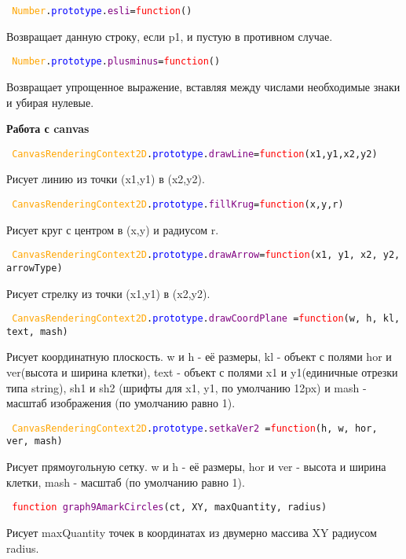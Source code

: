 \texttt{
	\textcolor{Orange}{Number}.\textcolor{Blue}{prototype}.\textcolor{Purple}{esli}=\textcolor{Red}{function}()
}

Возвращает данную строку, если p1, и пустую в противном случае.

\texttt{
	\textcolor{Orange}{Number}.\textcolor{Blue}{prototype}.\textcolor{Purple}{plusminus}=\textcolor{Red}{function}()
}

Возвращает упрощенное выражение, вставляя между числами необходимые знаки и убирая нулевые.

\textbf{Работа с canvas}

\texttt{
	\textcolor{Orange}{CanvasRenderingContext2D}.\textcolor{Blue}{prototype}.\textcolor{Purple}{drawLine}=\textcolor{Red}{function}(x1,y1,x2,y2)
}

Рисует линию из точки (x1,y1) в (x2,y2).

\texttt{
	\textcolor{Orange}{CanvasRenderingContext2D}.\textcolor{Blue}{prototype}.\textcolor{Purple}{fillKrug}=\textcolor{Red}{function}(x,y,r)
}

Рисует круг с центром в (x,y) и радиусом r.

\texttt{
	\textcolor{Orange}{CanvasRenderingContext2D}.\textcolor{Blue}{prototype}.\textcolor{Purple}{drawArrow}=\textcolor{Red}{function}(x1, y1, x2, y2, arrowType)
}%

Рисует стрелку из точки (x1,y1) в (x2,y2).

\texttt{
	\textcolor{Orange}{CanvasRenderingContext2D}.\textcolor{Blue}{prototype}.\textcolor{Purple}{drawCoordPlane }=\textcolor{Red}{function}(w, h, kl, text, mash)
}

Рисует координатную плоскость. w и h  \-- её размеры, kl \-- объект с полями hor и ver(высота и ширина клетки), text \-- объект с полями x1 и y1(единичные отрезки типа string), sh1 и sh2 (шрифты для x1, y1, по умолчанию 12px) и mash - масштаб изображения (по умолчанию равно 1).

\texttt{
	\textcolor{Orange}{CanvasRenderingContext2D}.\textcolor{Blue}{prototype}.\textcolor{Purple}{setkaVer2  }=\textcolor{Red}{function}(h, w, hor, ver, mash)
}

Рисует прямоугольную сетку. w и h  \-- её размеры, hor и ver \-- высота и ширина клетки, mash - масштаб (по умолчанию равно 1).

\texttt{
	\textcolor{Red}{function} \textcolor{Purple}{graph9AmarkCircles}(ct, XY, maxQuantity, radius)
}

Рисует maxQuantity точек в координатах из двумерно массива XY радиусом radius.

